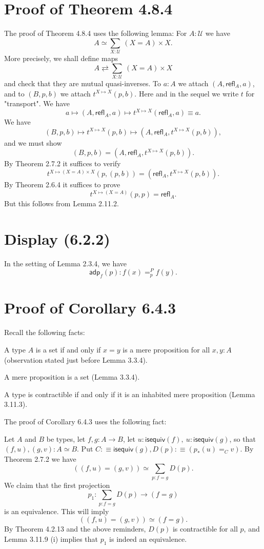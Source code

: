 \documentclass[12pt]{article}
\newcommand{\msf}{\mathsf}
\newcommand{\refl}{\mathsf{refl}}
\newcommand{\U}{\mathcal U}
\begin{document}

\section{Proof of Theorem 4.8.4}

The proof of Theorem 4.8.4 uses the following lemma: For $A:\U$ we have 
$$
A\simeq\sum_{X:\U}\ (X=A)\times X.
$$
More precisely, we shall define maps 
$$
A\rightleftarrows\sum_{X:\U}\ (X=A)\times X
$$ 
and check that they are mutual quasi-inverses. To $a:A$ we attach $(A,\refl_A,a)$, and to $(B,p,b)$ we attach $t^{X\mapsto X}(p,b)$. Here and in the sequel we write $t$ for "transport". We have 
$$
a\mapsto(A,\refl_A,a)\mapsto t^{X\mapsto X}(\refl_A,a)\equiv a.
$$ 
We have 
$$
(B,p,b)\mapsto t^{X\mapsto X}(p,b)\mapsto(A,\refl_A,t^{X\mapsto X}(p,b)),
$$ 
and we must show 
$$
(B,p,b)=(A,\refl_A,t^{X\mapsto X}(p,b)).
$$ 
By Theorem 2.7.2 it suffices to verify 
$$
t^{X\mapsto (X=A)\times X}(p,(p,b))=(\refl_A,t^{X\mapsto X}(p,b)).
$$ 
By Theorem 2.6.4 it suffices to prove 
$$
t^{X\mapsto (X=A)}(p,p)=\refl_A.
$$ 
But this follows from Lemma 2.11.2.


\section{Display (6.2.2)}

In the setting of Lemma 2.3.4, we have 
$$
\msf{adp}_f(p):f(x)=^P_pf(y).
$$


\section{Proof of Corollary 6.4.3}

Recall the following facts: 

A type $A$ is a set if and only if $x=y$ is a mere proposition for all $x,y:A$ (observation stated just before Lemma 3.3.4). 

A mere proposition is a set (Lemma 3.3.4).

A type is contractible if and only if it is an inhabited mere proposition (Lemma 3.11.3). 

The proof of Corollary 6.4.3 uses the following fact:

Let $A$ and $B$ be types, let $f,g:A\to B$, let $u:\mathsf{isequiv}(f),\ u:\mathsf{isequiv}(g)$, so that $(f,u),(g,v):A\simeq B$. Put $C:\equiv\mathsf{isequiv}(g), D(p):\equiv(p_*(u)=_Cv)$. By Theorem 2.7.2 we have 
$$
((f,u)=(g,v))\simeq\sum_{p:f=g}D(p).
$$ 
We claim that the first projection 
$$
p_1:\sum_{p:f=g}D(p)\to(f=g)
$$ 
is an equivalence. This will imply 
$$
((f,u)=(g,v))\simeq(f=g).
$$ 
By Theorem 4.2.13 and the above reminders, $D(p)$ is contractible for all $p$, and Lemma 3.11.9 (i) implies that $p_1$ is indeed an equivalence.
\end{document}
